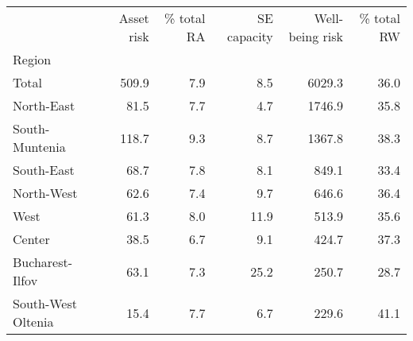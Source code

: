 \begin{tabular}{lrrrrr}
\toprule
{} &  Asset risk &  \% total RA &  SE capacity &  Well-being risk &  \% total RW \\
Region             &             &             &              &                  &             \\
\midrule
Total              &       509.9 &         7.9 &          8.5 &           6029.3 &        36.0 \\
North-East         &        81.5 &         7.7 &          4.7 &           1746.9 &        35.8 \\
South-Muntenia     &       118.7 &         9.3 &          8.7 &           1367.8 &        38.3 \\
South-East         &        68.7 &         7.8 &          8.1 &            849.1 &        33.4 \\
North-West         &        62.6 &         7.4 &          9.7 &            646.6 &        36.4 \\
West               &        61.3 &         8.0 &         11.9 &            513.9 &        35.6 \\
Center             &        38.5 &         6.7 &          9.1 &            424.7 &        37.3 \\
Bucharest-Ilfov    &        63.1 &         7.3 &         25.2 &            250.7 &        28.7 \\
South-West Oltenia &        15.4 &         7.7 &          6.7 &            229.6 &        41.1 \\
\bottomrule
\end{tabular}

